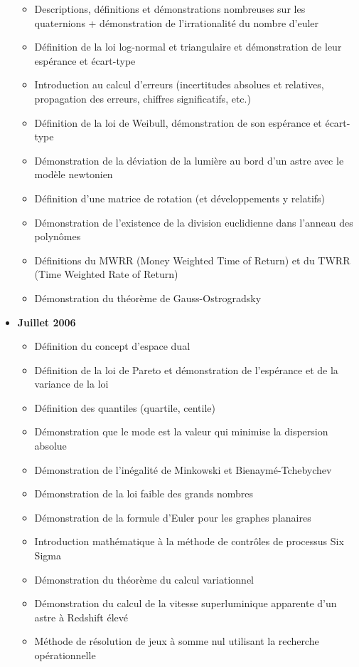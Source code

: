 \documentclass[12pt,a4paper,twoside,openright]{report}
\theoremstyle{definition}
\theoremstyle{itexmp}
\numberwithin{equation}{section}
\begin{document}
\begin{itemize}
\begin{itemize}[noitemsep]
				\item Descriptions, définitions et démonstrations nombreuses sur les quaternions + démonstration de l'irrationalité du nombre d'euler
				\item Définition de la loi log-normal et triangulaire et démonstration de leur espérance et écart-type
				\item Introduction au calcul d'erreurs (incertitudes absolues et relatives, propagation des erreurs, chiffres significatifs, etc.)
				\item Définition de la loi de Weibull, démonstration de son espérance et écart-type
				\item Démonstration de la déviation de la lumière au bord d'un astre avec le modèle newtonien
				\item Définition d'une matrice de rotation (et développements y relatifs)
				\item Démonstration de l'existence de la division euclidienne dans l'anneau des polynômes
				\item Définitions du MWRR (Money Weighted Time of Return) et du TWRR (Time Weighted Rate of Return)
				\item Démonstration du théorème de Gauss-Ostrogradsky 
			\end{itemize}
		\item \textbf{Juillet 2006}
			\begin{itemize}[noitemsep]
				\item Définition du concept d'espace dual
				\item Définition de la loi de Pareto et démonstration de l'espérance et de la variance de la loi
				\item Définition des quantiles (quartile, centile)
				\item Démonstration que le mode est la valeur qui minimise la dispersion absolue
				\item Démonstration de l'inégalité de Minkowski et Bienaymé-Tchebychev
				\item Démonstration de la loi faible des grands nombres
				\item Démonstration de la formule d'Euler pour les graphes planaires
				\item Introduction mathématique à la méthode de contrôles de processus Six Sigma
				\item Démonstration du théorème du calcul variationnel
				\item Démonstration du calcul de la vitesse superluminique apparente d'un astre à Redshift élevé
				\item Méthode de résolution de jeux à somme nul utilisant la recherche opérationnelle

\end{itemize}
\end{itemize}
\end{document}
